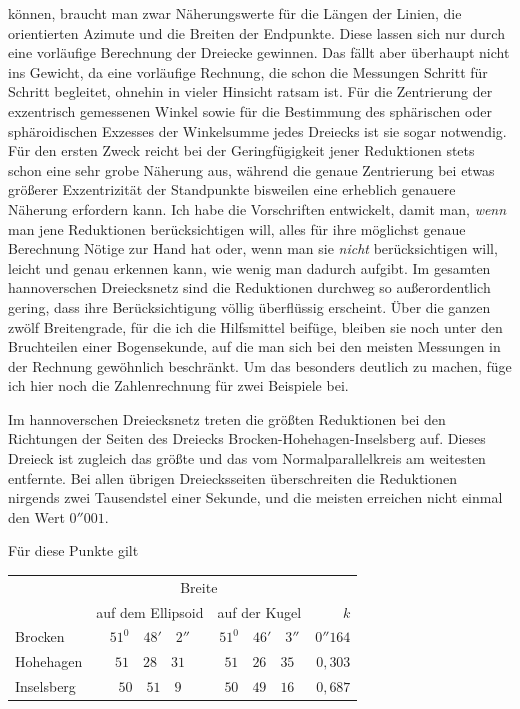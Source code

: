 %
können, braucht man zwar Näherungswerte für die Längen der Linien, die orientierten Azimute und die Breiten der Endpunkte. Diese lassen sich nur durch eine vorläufige Berechnung der Dreiecke gewinnen. Das fällt aber überhaupt nicht ins Gewicht, da eine vorläufige Rechnung, die schon die Messungen Schritt für Schritt begleitet, ohnehin in vieler Hinsicht ratsam ist. Für die Zentrierung der exzentrisch gemessenen Winkel sowie für die Bestimmung des sphärischen oder sphäroidischen Exzesses der Winkelsumme jedes Dreiecks ist sie sogar notwendig. Für den ersten Zweck reicht bei der Geringfügigkeit jener Reduktionen stets schon eine sehr grobe Näherung aus, während die genaue Zentrierung bei etwas größerer Exzentrizität der Standpunkte bisweilen eine erheblich genauere Näherung erfordern kann. Ich habe die Vorschriften entwickelt, damit man, \textit{wenn} man jene Reduktionen berücksichtigen will, alles für ihre möglichst genaue Berechnung Nötige zur Hand hat oder, wenn man sie \textit{nicht} berücksichtigen will, leicht und genau erkennen kann, wie wenig man dadurch aufgibt. Im gesamten hannoverschen Dreiecksnetz sind die Reduktionen durchweg so außerordentlich gering, dass ihre Berücksichtigung völlig überflüssig erscheint. Über die ganzen zwölf Breitengrade, für die ich die Hilfsmittel beifüge, bleiben sie noch unter den Bruchteilen einer Bogensekunde, auf die man sich bei den meisten Messungen in der Rechnung gewöhnlich beschränkt. Um das besonders deutlich zu machen, füge ich hier noch die Zahlenrechnung für zwei Beispiele bei.

Im hannoverschen Dreiecksnetz treten die größten Reduktionen bei den Richtungen der Seiten des Dreiecks Brocken-Hohehagen-Inselsberg auf. Dieses Dreieck ist zugleich das größte und das vom Normalparallelkreis am weitesten entfernte. Bei allen übrigen Dreiecksseiten überschreiten die Reduktionen nirgends zwei Tausendstel einer Sekunde, und die meisten erreichen nicht einmal den Wert \(0''001\).

Für diese Punkte gilt
\begin{center}
\begin{tabular}{l|c|c|r}
&\multicolumn{2}{c|}{Breite}&\\
&auf dem Ellipsoid&auf der Kugel&\(k\)\\\hline
Brocken&\(51^0\quad48'\quad2''\)&\(51^0\quad46'\quad3''\)&\(0''164\)\\
Hohehagen&\(51\quad28\quad31\)&\(51\quad26\quad35\)&\(0{,}303\)\\
Inselsberg&\(50\quad51\quad9\)&\(50\quad49\quad16\)&\(0{,}687\)
\end{tabular}
\end{center}
